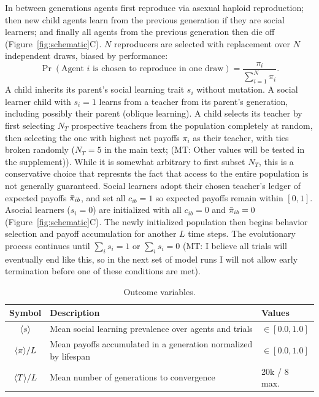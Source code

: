 \documentclass[letterpaper,11.5pt]{scrartcl}
\newcommand{\mt}[1]{{\textcolor{myorange} {({\tiny MT:} #1)}}}
\begin{document}
In between generations agents first reproduce via asexual haploid reproduction; 
then new child agents learn from the
previous generation if they are social learners; and finally all agents from the
previous generation then die off (Figure~\ref{fig:schematic}C). 
$N$ reproducers are selected with replacement over $N$ independent draws, 
biased by performance:
\begin{equation}
  \Pr(\text{Agent $i$ is chosen to reproduce in one draw}) = \frac{\pi_i}{\sum_{i=1}^N \pi_i}.
\end{equation}
\noindent
A child inherits its parent's social learning trait $s_i$ without mutation.
A social learner child with $s_i = 1$ learns from a teacher from its parent's
generation, including possibly their parent (oblique learning). 
A child selects its teacher by first selecting $N_T$ prospective
teachers from the population completely at random, then selecting the one with
highest net payoffs $\pi_i$ as their teacher, with ties broken randomly ($N_T =
5$ in the main text; \mt{Other values will be tested in the supplement}). While it
is somewhat arbitrary to first subset $N_T$, this is a conservative choice that
represnts the fact that access to the entire population is not generally guaranteed.
Social learners adopt their chosen teacher's ledger of expected payoffs $\bar\pi_{ib}$,
and set all $c_{ib} = 1$ so expected payoffs remain within $[0, 1]$.  Asocial
learners ($s_i = 0$) are initialized with all $c_{ib} = 0$ and $\bar\pi_{ib} = 0$ 
(Figure~\ref{fig:schematic}C). The
newly initialized population then begins behavior selection and payoff accumulation
for another $L$ time steps. The evolutionary process continues until $\sum_i s_i
= 1$ or $\sum_i s_i = 0$ \mt{I believe all trials will eventually end like this, so
in the next set of model runs I will not allow early termination before one of these
conditions are met}.

\begin{table}[h]
    \caption{Outcome variables.}
    \label{tab:outcomeVariables}
    \centering %
    \begin{tabular}{cp{4.25in}p{0.85in}} \toprule

        Symbol & Description & Values \\ 

        \midrule  

        $\langle s \rangle$ & Mean social learning prevalence over agents and trials
                  & $\in [0.0, 1.0]$ \\

        $\langle \pi \rangle / L$ & Mean payoffs accumulated in a generation normalized by
        lifespan & $\in [0.0, 1.0]$ \\

        $\langle T \rangle / L$ & Mean number of generations to convergence & 20k / 8 max. \\
        \bottomrule
    \end{tabular}
\end{table}
\end{document}
